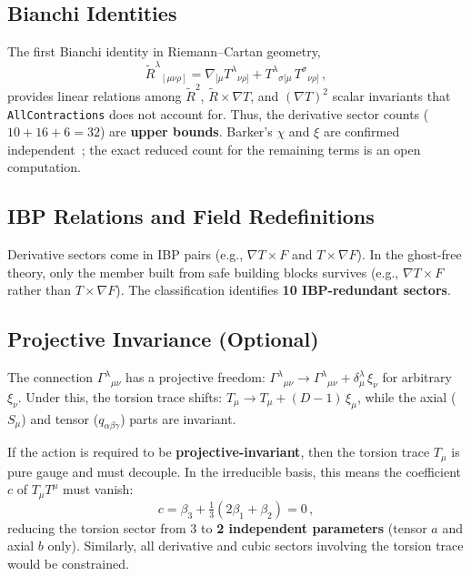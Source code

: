 \documentclass[12pt,a4paper]{article}
\newcommand{\Rt}{\tilde{R}}         %
\newcommand{\del}{\nabla}            %
\begin{document}
\subsection{Bianchi Identities}
\label{sec:bianchi}

The first Bianchi identity in Riemann--Cartan geometry,
\begin{equation}
  \Rt^\lambda{}_{[\mu\nu\rho]}
  = \del_{[\mu} T^\lambda{}_{\nu\rho]}
  + T^\lambda{}_{\sigma[\mu}\, T^\sigma{}_{\nu\rho]}\,,
  \label{eq:bianchi_1}
\end{equation}
provides linear relations among $\Rt^2$, $\Rt \times \del T$, and
$(\del T)^2$ scalar invariants that \texttt{AllContractions} does
not account for. Thus, the derivative sector counts ($10 + 16 + 6 = 32$)
are \textbf{upper bounds}. Barker's $\chi$ and $\xi$ are confirmed
independent~\cite{Barker:2024ydb}; the exact reduced count for the
remaining terms is an open computation.


\subsection{IBP Relations and Field Redefinitions}
\label{sec:ibp}

Derivative sectors come in IBP pairs (e.g., $\del T \times F$
and $T \times \del F$). In the ghost-free theory, only the
member built from safe building blocks survives (e.g.,
$\del T \times F$ rather than $T \times \del F$).
The classification identifies \textbf{10 IBP-redundant sectors}.


\subsection{Projective Invariance (Optional)}
\label{sec:projective}

The connection $\Gamma^\lambda{}_{\mu\nu}$ has a projective freedom:
$\Gamma^\lambda{}_{\mu\nu} \to \Gamma^\lambda{}_{\mu\nu}
+ \delta^\lambda_\mu\, \xi_\nu$ for arbitrary $\xi_\nu$. Under this,
the torsion trace shifts:
$T_\mu \to T_\mu + (D{-}1)\,\xi_\mu$, while the axial ($S_\mu$)
and tensor ($q_{\alpha\beta\gamma}$) parts are invariant.

If the action is required to be \textbf{projective-invariant}, then
the torsion trace $T_\mu$ is pure gauge and must decouple. In the
irreducible basis, this means the coefficient $c$ of $T_\mu T^\mu$
must vanish:
\begin{equation}
  c = \beta_3 + \tfrac{1}{3}(2\beta_1 + \beta_2) = 0\,,
  \label{eq:projective}
\end{equation}
reducing the torsion sector from 3 to \textbf{2 independent
parameters} (tensor $a$ and axial $b$ only). Similarly, all
derivative and cubic sectors involving the torsion trace would
be constrained.
\end{document}
